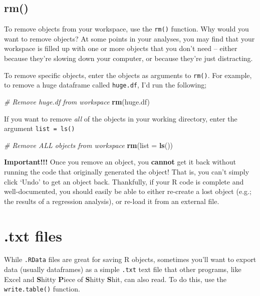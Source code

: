 \documentclass[]{book}
\newenvironment{Shaded}{\begin{snugshade}}{\end{snugshade}}
\newcommand{\KeywordTok}[1]{\textcolor[rgb]{0.13,0.29,0.53}{\textbf{#1}}}
\newcommand{\DataTypeTok}[1]{\textcolor[rgb]{0.13,0.29,0.53}{#1}}
\newcommand{\CommentTok}[1]{\textcolor[rgb]{0.56,0.35,0.01}{\textit{#1}}}
\newcommand{\NormalTok}[1]{#1}
\theoremstyle{definition}
\theoremstyle{definition}
\theoremstyle{remark}
\begin{document}
\subsection{rm()}\label{rm}

To remove objects from your workspace, use the \texttt{rm()} function.
Why would you want to remove objects? At some points in your analyses,
you may find that your workspace is filled up with one or more objects
that you don't need -- either because they're slowing down your
computer, or because they're just distracting.

To remove specific objects, enter the objects as arguments to
\texttt{rm()}. For example, to remove a huge dataframe called
\texttt{huge.df}, I'd run the following;

\begin{Shaded}
\begin{Highlighting}[]
\CommentTok{# Remove huge.df from workspace}
\KeywordTok{rm}\NormalTok{(huge.df)}
\end{Highlighting}
\end{Shaded}

If you want to remove \emph{all} of the objects in your working
directory, enter the argument \texttt{list\ =\ ls()}

\begin{Shaded}
\begin{Highlighting}[]
\CommentTok{# Remove ALL objects from workspace}
\KeywordTok{rm}\NormalTok{(}\DataTypeTok{list =} \KeywordTok{ls}\NormalTok{())}
\end{Highlighting}
\end{Shaded}

\textbf{Important!!!} Once you remove an object, you \textbf{cannot} get
it back without running the code that originally generated the object!
That is, you can't simply click `Undo' to get an object back.
Thankfully, if your R code is complete and well-documented, you should
easily be able to either re-create a lost object (e.g.; the results of a
regression analysis), or re-load it from an external file.

\section{.txt files}\label{txt-files}

While \texttt{.RData} files are great for saving R objects, sometimes
you'll want to export data (usually dataframes) as a simple
\texttt{.txt} text file that other programs, like Excel and
\textbf{S}hitty \textbf{P}iece of \textbf{S}hitty \textbf{S}hit, can
also read. To do this, use the \texttt{write.table()} function.
\end{document}
